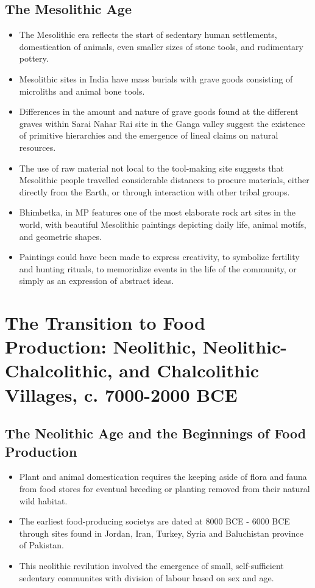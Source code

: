 \subsection{The Mesolithic Age}
\begin{itemize}
    \item The Mesolithic era reflects the start of sedentary human settlements, domestication of animals, even smaller sizes of stone tools, and rudimentary pottery.
    \item Mesolithic sites in India have mass burials with grave goods consisting of \glspl{microlith} and animal bone tools.
    \item Differences in the amount and nature of grave goods found at the different graves within Sarai Nahar Rai site in the Ganga valley suggest the existence of primitive hierarchies and the emergence of lineal claims on natural resources.
    \item The use of raw material not local to the tool-making site suggests that Mesolithic people travelled considerable distances to procure materials, either directly from the Earth, or through interaction with other tribal groups.
    \item Bhimbetka, in MP features one of the most elaborate rock art sites in the world, with beautiful Mesolithic paintings depicting daily life, animal motifs, and geometric shapes.
    \item Paintings could have been made to express creativity, to symbolize fertility and hunting rituals, to memorialize events in the life of the community, or simply as an expression of abstract ideas.
\end{itemize}

\section{The Transition to Food Production: Neolithic, Neolithic-Chalcolithic, and Chalcolithic Villages, c. 7000-2000 BCE}

\subsection{The Neolithic Age and the Beginnings of Food Production}
\begin{itemize}
    \item Plant and animal domestication requires the keeping aside of flora and fauna from food stores for eventual breeding or planting removed from their natural wild habitat.
    \item The earliest \glspl{food-producing society} are dated at 8000 BCE - 6000 BCE through sites found in Jordan, Iran, Turkey, Syria and Baluchistan province of Pakistan.
    \item This neolithic revilution involved the emergence of small, self-sufficient sedentary communites with division of labour based on sex and age.
\end{itemize}

